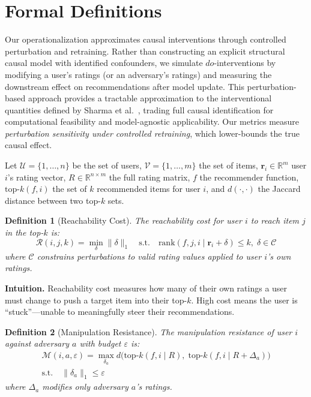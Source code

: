 \documentclass[sigconf,anonymous]{acmart}
\newtheorem{definition}{Definition}
\begin{document}
\section{Formal Definitions}
\label{sec:definitions}

Our operationalization approximates causal interventions through controlled perturbation and retraining. Rather than constructing an explicit structural causal model with identified confounders, we simulate $do$-interventions by modifying a user's ratings (or an adversary's ratings) and measuring the downstream effect on recommendations after model update. This perturbation-based approach provides a tractable approximation to the interventional quantities defined by Sharma et al.~\cite{sharma2024unified}, trading full causal identification for computational feasibility and model-agnostic applicability. Our metrics measure \emph{perturbation sensitivity under controlled retraining}, which lower-bounds the true causal effect.

Let $\mathcal{U} = \{1, \ldots, n\}$ be the set of users, $\mathcal{V} = \{1, \ldots, m\}$ the set of items, $\mathbf{r}_i \in \mathbb{R}^m$ user $i$'s rating vector, $R \in \mathbb{R}^{n \times m}$ the full rating matrix, $f$ the recommender function, $\text{top-}k(f, i)$ the set of $k$ recommended items for user $i$, and $d(\cdot, \cdot)$ the Jaccard distance between two top-$k$ sets.

\begin{definition}[Reachability Cost]
\label{def:reachability}
The reachability cost for user $i$ to reach item $j$ in the top-$k$ is:
\begin{equation}
    \mathcal{R}(i, j, k) = \min_{\delta} \|\delta\|_1 \quad \text{s.t.} \quad \text{rank}(f, j, i \mid \mathbf{r}_i + \delta) \leq k, \; \delta \in \mathcal{C}
\end{equation}
where $\mathcal{C}$ constrains perturbations to valid rating values applied to user $i$'s \emph{own} ratings.
\end{definition}

\noindent \textbf{Intuition.} Reachability cost measures how many of their own ratings a user must change to push a target item into their top-$k$. High cost means the user is ``stuck''---unable to meaningfully steer their recommendations.

\begin{definition}[Manipulation Resistance]
\label{def:manipulation}
The manipulation resistance of user $i$ against adversary $a$ with budget $\varepsilon$ is:
\begin{multline}
    \mathcal{M}(i, a, \varepsilon) = \max_{\delta_a} d\!\bigl(\text{top-}k(f, i \mid R), \; \text{top-}k(f, i \mid R + \Delta_a)\bigr) \\
    \text{s.t.} \quad \|\delta_a\|_1 \leq \varepsilon
\end{multline}
where $\Delta_a$ modifies \emph{only} adversary $a$'s ratings.
\end{definition}
\end{document}
